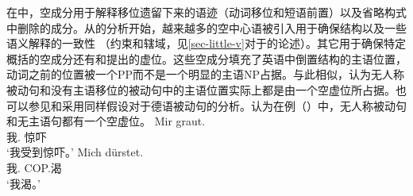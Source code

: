 在\gbtc 中，空成分用于解释移位遗留下来的语迹（动词移位和短语前置）以及省略构式中删除的成分。从\citet{Larson88a}的分析开始，越来越多的空中心语被引入用于确保结构以及一些语义解释的一致性 （约束和辖域，见\ref{sec-little-v}对于\littlevc 的论述）。其它用于确保特定概括的空成分还有\citet[]{Coopmans-89a-u}和\citet[Chapter~1]{Postal2004a-u}提出的虚位。这些空成分填充了英语中倒置结构的主语位置，动词之前的位置被一个PP而不是一个明显的主语NP占据。与此相似，\citet[]{Grewendorf93}认为无人称被动句和没有主语移位的被动句中的主语位置实际上都是由一个空虚位所占据。也可以参见和\citet[]{Lohnstein2014a}采用同样假设对于德语被动句的分析。\citet[\S~II.3.3.3]{Sternefeld2006a-u}认为在例（）中，无人称被动句和无主语句都有一个空虚位。
\eal
\ex 
\gll Mir graut.\\
	 我.\dat{} 惊吓\\
\glt `我受到惊吓。'
\ex 
\gll Mich dürstet.\\
	我.\acc{} COP.渴\\
\glt `我渴。'
\zl

